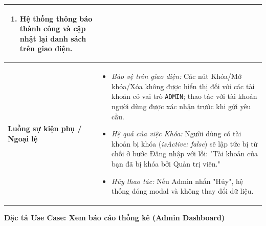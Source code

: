 \documentclass[12pt,a4paper]{article}
\begin{document}
\begin{center}
\begin{tabular}{|p{4cm}|p{10cm}|}
\begin{enumerate}
\begin{itemize}
        \end{itemize}
    \item Hệ thống thông báo thành công và cập nhật lại danh sách trên giao diện.
\end{enumerate} \\ \hline
\textbf{Luồng sự kiện phụ / Ngoại lệ} & 
\begin{itemize}
    \item \textit{Bảo vệ trên giao diện:} Các nút Khóa/Mở khóa/Xóa không được hiển thị đối với các tài khoản có vai trò \texttt{ADMIN}; thao tác với tài khoản người dùng được xác nhận trước khi gửi yêu cầu.
    \item \textit{Hệ quả của việc Khóa:} Người dùng có tài khoản bị khóa (\textit{isActive: false}) sẽ lập tức bị từ chối ở bước Đăng nhập với lỗi: "Tài khoản của bạn đã bị khóa bởi Quản trị viên."
    \item \textit{Hủy thao tác:} Nếu Admin nhấn "Hủy", hệ thống đóng modal và không thay đổi dữ liệu.
\end{itemize} \\ \hline
\end{tabular}
\end{center}


\vspace{0.5cm}
\vspace{0.5cm}
\textbf{Đặc tả Use Case: Xem báo cáo thống kê (Admin Dashboard)}
\end{document}
